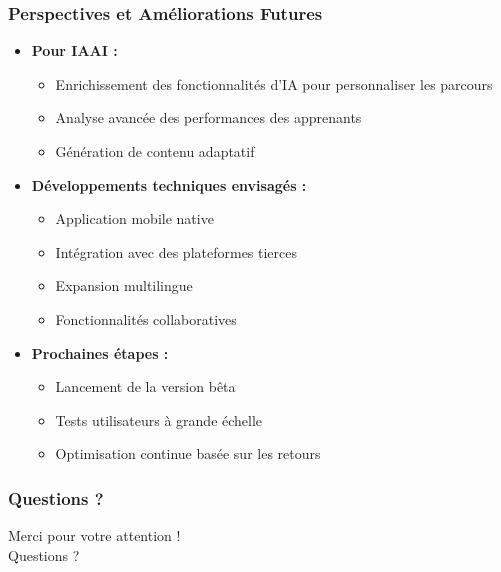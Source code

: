\documentclass{beamer}
\begin{document}
\begin{frame}
\frametitle{Perspectives et Améliorations Futures}
\begin{itemize}
    \item \textbf{Pour IAAI :}
    \begin{itemize}
        \item Enrichissement des fonctionnalités d'IA pour personnaliser les parcours
        \item Analyse avancée des performances des apprenants
        \item Génération de contenu adaptatif
    \end{itemize}
    \item \textbf{Développements techniques envisagés :}
    \begin{itemize}
        \item Application mobile native
        \item Intégration avec des plateformes tierces
        \item Expansion multilingue
        \item Fonctionnalités collaboratives
    \end{itemize}
    \item \textbf{Prochaines étapes :}
    \begin{itemize}
        \item Lancement de la version bêta
        \item Tests utilisateurs à grande échelle
        \item Optimisation continue basée sur les retours
    \end{itemize}
\end{itemize}
\end{frame}

\begin{frame}
\frametitle{Questions ?}
\begin{center}
    \LARGE Merci pour votre attention !\\
    \vspace{1cm}
    Questions ?
\end{center}
\end{frame}
\end{document}

